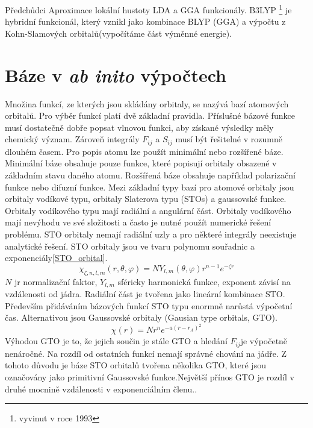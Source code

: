 \documentclass[
  digital, %
  table,   %
  lof,     %
  lot,     %
]{fithesis3}
\begin{document}
Předchůdci Aproximace lokální hustoty LDA a GGA funkcionály. B3LYP \footnote{vyvinut v roce 1993} je hybridní funkcionál, který vznikl jako kombinace BLYP (GGA) a výpočtu z Kohn-Slamových orbitalů(vypočítáme část výměnné energie).


\section{Báze v \textit{ab inito} výpočtech }\label{kapitola_baze}
Množina funkcí, ze kterých jsou skládány orbitaly, se nazývá bazí atomových orbitalů. Pro výběr funkcí platí dvě základní pravidla. Příslušné bázové funkce musí dostatečně dobře popsat vlnovou funkci, aby získané výsledky měly chemický význam. Zároveň integrály $F_{ij}$ a $S_{ij}$ musí být řešitelné v rozumně dlouhém časem. \cite{lowe2011quantum}
Pro popis atomu lze použít minimální nebo rozšířené báze. Minimální báze obsahuje pouze funkce, které popisují orbitaly obsazené v základním stavu daného atomu. Rozšířená báze obsahuje například polarizační funkce nebo difuzní funkce. Mezi základní typy bazí pro atomové orbitaly jsou orbitaly vodíkové typu, orbitaly Slaterova typu (STOs) a gaussovské funkce. \cite{dftshrnutivysledky}
Orbitaly vodíkového typu mají radiální a angulární část. Orbitaly vodíkového mají nevýhodu ve své složitosti a často je nutné použít numerické řešení problému. STO orbitaly nemají radiální uzly a pro některé integrály neexistuje analytické řešení. STO orbitaly jsou ve tvaru polynomu souřadnic a exponenciály\ref{STO_orbital}.\cite{jensen2007introduction}
\begin{equation}
\chi_{\zeta, n, l, m}(r, \theta, \varphi) = NY_{l,m} (\theta, \varphi) r^{n-1} e^{-\zeta r}
\label{STO_orbital} 
\end{equation}
$N$ jr normalizační faktor, $Y_{l,m}$ sféricky harmonická funkce, exponent závisí na vzdálenosti od jádra. Radiální část je tvořena jako lineární kombinace STO. Především přidáváním bázových funkcí STO typu enormně narůstá výpočetní čas. Alternativou jsou Gaussovské orbitaly (Gausian type orbitals, GTO).
\begin{equation}
\chi(r) = Nr^n e^{-a(r-r_A)^2}
\end{equation}
 Výhodou GTO je to, že jejich součin je stále GTO a hledání $F_{ij}$je výpočetně nenáročné. Na rozdíl od ostatních funkcí nemají správné chování na jádře. Z tohoto důvodu je báze STO orbitalů tvořena několika GTO, které jsou označovány jako primitivní Gaussovské funkce.Největší přínos GTO je rozdíl v druhé mocnině vzdálenosti v exponenciálním členu.\cite{lowe2011quantum}. 
\end{document}
